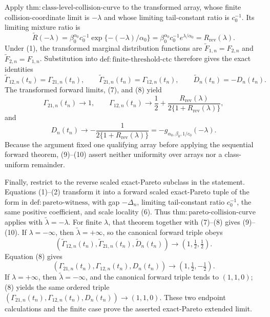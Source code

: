 Apply \(\mathrm{thm{:}class\text{-}level\text{-}collision\text{-}curve}\) to the transformed array, whose finite collision-coordinate limit is \(-\lambda\) and whose limiting tail-constant ratio is \(c_0^{-1}\). Its limiting mixture ratio is
\[
\widetilde R(-\lambda)
=\beta_0^{\alpha_0}c_0^{-1}
\exp\{-(-\lambda)/\alpha_0\}
=\beta_0^{\alpha_0}c_0^{-1}e^{\lambda/\alpha_0}
=R_{\mathrm{rev}}(\lambda).
\tag{7}
\]
Under (1), the transformed marginal distribution functions are \(\widetilde F_{1,n}=F_{2,n}\) and \(\widetilde F_{2,n}=F_{1,n}\). Substitution into \(\mathrm{def{:}finite\text{-}threshold\text{-}ctc}\) therefore gives the exact identities
\[
\widetilde\Gamma_{12,n}(t_n)=\Gamma_{21,n}(t_n),
\qquad
\widetilde\Gamma_{21,n}(t_n)=\Gamma_{12,n}(t_n),
\qquad
\widetilde D_n(t_n)=-D_n(t_n).
\tag{8}
\]
The transformed forward limits, (7), and (8) yield
\[
\Gamma_{21,n}(t_n)\to1,
\qquad
\Gamma_{12,n}(t_n)\to
\frac12+\frac{R_{\mathrm{rev}}(\lambda)}{2\{1+R_{\mathrm{rev}}(\lambda)\}},
\tag{9}
\]
and
\[
D_n(t_n)\to
-\frac1{2\{1+R_{\mathrm{rev}}(\lambda)\}}
=-g_{\alpha_0,\beta_0,1/c_0}(-\lambda).
\tag{10}
\]
Because the argument fixed one qualifying array before applying the sequential forward theorem, (9)--(10) assert neither uniformity over arrays nor a class-uniform remainder.

Finally, restrict to the reverse scaled exact-Pareto subclass in the statement. Equations (1)--(2) transform it into a forward scaled exact-Pareto tuple of the form in \(\mathrm{def{:}pareto\text{-}witness}\), with gap \(-\Delta_n\), limiting tail-constant ratio \(c_0^{-1}\), the same positive coefficient, and scale locality (6). Thus \(\mathrm{thm{:}pareto\text{-}collision\text{-}curve}\) applies with \(\widetilde\lambda=-\lambda\). For finite \(\lambda\), that theorem together with (7)--(8) gives (9)--(10). If \(\lambda=-\infty\), then \(\widetilde\lambda=+\infty\), so the canonical forward triple obeys
\[
(\widetilde\Gamma_{12,n}(t_n),\widetilde\Gamma_{21,n}(t_n),\widetilde D_n(t_n))
\longrightarrow(1,\tfrac12,\tfrac12).
\]
Equation (8) gives
\[
(\Gamma_{21,n}(t_n),\Gamma_{12,n}(t_n),D_n(t_n))
\longrightarrow(1,\tfrac12,-\tfrac12).
\]
If \(\lambda=+\infty\), then \(\widetilde\lambda=-\infty\), and the canonical forward triple tends to \((1,1,0)\); (8) yields the same ordered triple \((\Gamma_{21,n}(t_n),\Gamma_{12,n}(t_n),D_n(t_n))\to(1,1,0)\). These two endpoint calculations and the finite case prove the asserted exact-Pareto extended limit.